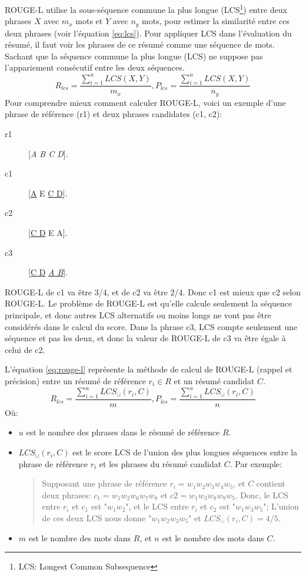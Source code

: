 \documentclass[a4paper,12pt,oneside]{../use/ESIthesis}
\begin{document}
ROUGE-L utilise la sous-séquence commune la plus longue (LCS\footnote{LCS: Longest Common Subsequence}) entre deux phrases $ X $ avec $m_x$ mots et $ Y $ avec $n_y$ mots, pour estimer la similarité entre ces deux phrases (voir l'équation \ref{eq:lcs}). 
Pour appliquer LCS dans l'évaluation du résumé, il faut voir les phrases de ce résumé comme une séquence de mots. 
Sachant que la séquence commune la plus longue (LCS) ne suppose pas l'appariement consécutif entre les deux séquences. 
\begin{equation}
\label{eq:lcs}
R_{lcs}= \frac {\sum_{i=1}^u {LCS(X, Y)}}{m_x}, 
P_{lcs}= \frac {\sum_{i=1}^u {LCS(X, Y)}}{n_y}
\end{equation}
Pour comprendre mieux comment calculer ROUGE-L, voici un exemple d'une phrase de référence (r1) et deux phrases candidates (c1, c2):
\begin{description}
\item[r1] [\textit{A B C D}].
\item[c1] [\underline{A} E \underline{C D}].
\item[c2] [\underline{C D} E A].
\item[c3] [\underline{C D} \underline{\textit{A B}}].
\end{description}
ROUGE-L de c1 va être 3/4, et de c2 va être 2/4. 
Donc c1 est mieux que c2 selon ROUGE-L. 
Le problème de ROUGE-L est qu'elle calcule seulement la séquence principale, et donc autres LCS alternatifs ou moins longs ne vont pas être considérés dans le calcul du score. 
Dans la phrase c3, LCS compte seulement une séquence et pas les deux, et donc la valeur de ROUGE-L de c3 va être égale à celui de c2.

L'équation \ref{eq:rouge-l} représente la méthode de calcul de ROUGE-L (rappel et précision) entre un résumé de référence $r_i \in R$ et un résumé candidat $C$. 
\begin{equation}
\label{eq:rouge-l}
R_{lcs}= \frac {\sum_{i=1}^u {LCS_{\cup}(r_i, C)}}{m}, 
P_{lcs}= \frac {\sum_{i=1}^u {LCS_{\cup}(r_i, C)}}{n}
\end{equation}
Où:
\begin{itemize}
\item $u$ est le nombre des phrases dans le résumé de référence $R$. 
\item $LCS_{\cup}(r_i, C)$ est le score LCS de l'union des plus longues séquences entre la phrase de référence $r_i$ et les phrases du résumé candidat $C$. Par exemple:
\begin{quote}
Supposant une phrase de référence $r_i = w_1 w_2 w_3 w_4 w_5$, et $C$ contient deux phrases: $c_1 = w_1 w_2 w_6 w_7 w_8$ et $c2 = w_1 w_3 w_8 w_9 w_5$. 
Donc, le LCS entre $r_i$ et $c_1$ est "$w_1 w_2$", et le LCS entre $r_i$ et $c_2$ est "$w_1 w_3 w_5$";
L'union de ces deux LCS nous donne "$w_1 w_2 w_3 w_5$" et $LCS_{\cup}(r_i, C)= 4/5$.
\end{quote}
\item $m$ est le nombre des mots dans $R$, et $n$ est le nombre des mots dans $C$. 
\end{itemize}
\end{document}
